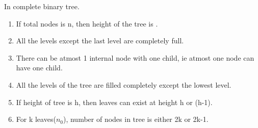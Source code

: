 \begin{enumerate}
    \begin{minipage}{\linewidth}
    \item In complete binary tree.
    \begin{enumerate}
        \item         If total nodes is n, then height of the tree is \fillin[].
        \item         All the levels except the last level are completely full.
        \item         There can be atmost 1 internal node with one child, ie atmost one node can have one child.
        \item         All the levels of the tree are filled completely except the lowest level.
        \item         If height of tree is h, then leaves can exist at height h or (h-1).
        \item         For k leaves(\(n_0\)), number of nodes in tree is either 2k or 2k-1.
    \end{enumerate}
    \end{minipage}


\end{enumerate}
























